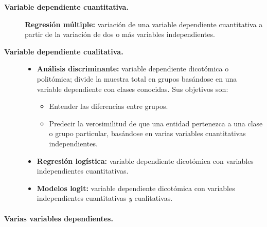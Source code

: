 \documentclass[12pt, a4paper]{article}
\theoremstyle{plain}
\theoremstyle{definition}
\theoremstyle{remark}
\begin{document}
\begin{description}
  \item[\textbf{Variable dependiente cuantitativa.}]
    \textbf{Regresión múltiple:} variación de una variable dependiente
    cuantitativa a partir de la variación de dos o más variables independientes.

  \item[\textbf{Variable dependiente cualitativa.}]
    \begin{itemize}
      \item \textbf{Análisis discriminante:} variable dependiente dicotómica o
            politómica; divide la muestra total en grupos basándose en una
            variable dependiente con clases conocidas. Sus objetivos son:
            \begin{itemize}
              \item Entender las diferencias entre grupos.
              \item Predecir la verosimilitud de que una entidad pertenezca a
                    una clase o grupo particular, basándose en varias variables
                    cuantitativas independientes.
            \end{itemize}
      \item \textbf{Regresión logística:} variable dependiente dicotómica con
            variables independientes cuantitativas.
      \item \textbf{Modelos logit:} variable dependiente dicotómica con variables
            independientes cuantitativas \emph{y} cualitativas.
    \end{itemize}
\end{description}

\paragraph{Varias variables dependientes.}
\end{document}
